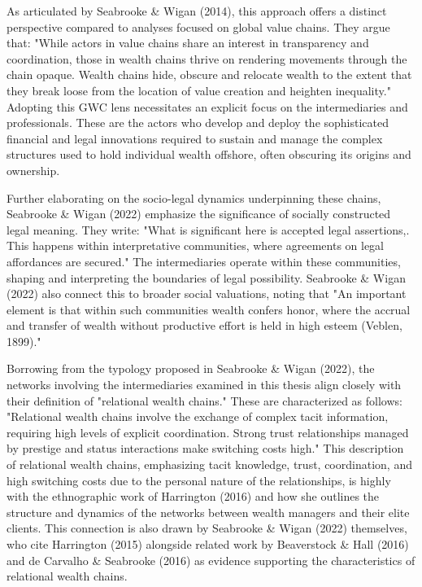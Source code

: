 As articulated by Seabrooke \& Wigan (2014), this approach offers a distinct perspective compared to analyses focused on global value chains. They argue that: "While actors in value chains share an interest in transparency and coordination, those in wealth chains thrive on rendering movements through the chain opaque. Wealth chains hide, obscure and relocate wealth to the extent that they break loose from the location of value creation and heighten inequality." Adopting this GWC lens necessitates an explicit focus on the intermediaries and professionals. These are the actors who develop and deploy the sophisticated financial and legal innovations required to sustain and manage the complex structures used to hold individual wealth offshore, often obscuring its origins and ownership.

Further elaborating on the socio-legal dynamics underpinning these chains, Seabrooke \& Wigan (2022) emphasize the significance of socially constructed legal meaning. They write: "What is significant here is accepted legal assertions,. This happens within interpretative communities, where agreements on legal affordances are secured." The intermediaries operate within these communities, shaping and interpreting the boundaries of legal possibility. Seabrooke \& Wigan (2022) also connect this to broader social valuations, noting that "An important element is that within such communities wealth confers honor, where the accrual and transfer of wealth without productive effort is held in high esteem (Veblen, 1899)." 

Borrowing from the typology proposed in Seabrooke \& Wigan (2022), the networks involving the intermediaries examined in this thesis align closely with their definition of "relational wealth chains."  These are characterized as follows: "Relational wealth chains involve the exchange of complex tacit information, requiring high levels of explicit coordination. Strong trust relationships managed by prestige and status interactions make switching costs high." This description of relational wealth chains, emphasizing tacit knowledge, trust, coordination, and high switching costs due to the personal nature of the relationships, is highly with the ethnographic work of Harrington (2016) and how she outlines the structure and dynamics of the networks between wealth managers and their elite clients. This connection is also drawn by Seabrooke \& Wigan (2022) themselves, who cite Harrington (2015) alongside related work by Beaverstock \& Hall (2016) and de Carvalho \& Seabrooke (2016) as evidence supporting the characteristics of relational wealth chains.

